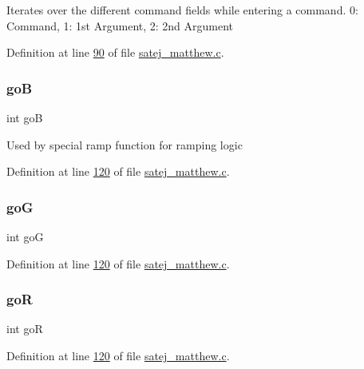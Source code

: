 Iterates over the different command fields while entering a command. 0\+: Command, 1\+: 1st Argument, 2\+: 2nd Argument 

Definition at line \mbox{\hyperlink{satej__matthew_8c_source_l00090}{90}} of file \mbox{\hyperlink{satej__matthew_8c_source}{satej\+\_\+matthew.\+c}}.

\mbox{\label{satej__matthew_8c_ae235a503c0bb6555e108f17b7edbd747}} 
\subsubsection{\texorpdfstring{goB}{goB}}
{\footnotesize\ttfamily int goB}

Used by special ramp function for ramping logic 

Definition at line \mbox{\hyperlink{satej__matthew_8c_source_l00120}{120}} of file \mbox{\hyperlink{satej__matthew_8c_source}{satej\+\_\+matthew.\+c}}.

\mbox{\label{satej__matthew_8c_a0cc12126d1ecb5d449eb84ba09e7c625}} 
\subsubsection{\texorpdfstring{goG}{goG}}
{\footnotesize\ttfamily int goG}



Definition at line \mbox{\hyperlink{satej__matthew_8c_source_l00120}{120}} of file \mbox{\hyperlink{satej__matthew_8c_source}{satej\+\_\+matthew.\+c}}.

\mbox{\label{satej__matthew_8c_a528b21c5fb0c0fcf4fe8f8bc549644b3}} 
\subsubsection{\texorpdfstring{goR}{goR}}
{\footnotesize\ttfamily int goR}



Definition at line \mbox{\hyperlink{satej__matthew_8c_source_l00120}{120}} of file \mbox{\hyperlink{satej__matthew_8c_source}{satej\+\_\+matthew.\+c}}.

\mbox{\label{satej__matthew_8c_adbd7138430ce795e6dd1d4534fccfc13}} 
